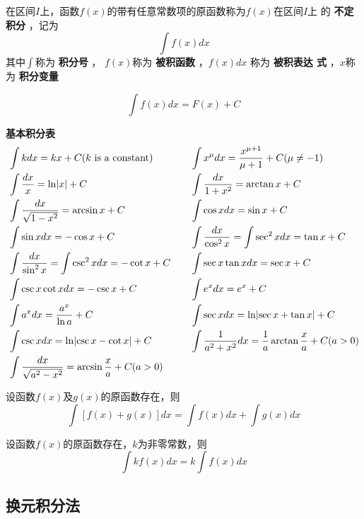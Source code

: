 \documentclass[11pt]{article}
\begin{document}
\begin{definition}[]
在区间\(I\)上，函数\(f(x)\)的带有任意常数项的原函数称为\(f(x)\)在区间\(I\)上
的 \textbf{不定积分} ，记为
\begin{equation*}
\int f(x)dx
\end{equation*}
其中\(\int\)称为 \textbf{积分号} ， \(f(x)\)称为 \textbf{被积函数} ，\(f(x)dx\) 称为 \textbf{被积表达
式} ，\(x\)称为 \textbf{积分变量}
\end{definition}

\begin{equation*}
\int f(x)dx=F(x)+C
\end{equation*}

\textbf{基本积分表}
\begin{alignat*}{2}
&\int kdx=kx+C(k\text{ is a constant})&&
\int x^\mu dx=\frac{x^{\mu+1}}{\mu+1}+C(\mu\neq-1)\\
&\int \frac{dx}{x}=\ln\abs{x}+C&&
\int\frac{dx}{1+x^2}=\arctan x+C\\
&\int\frac{dx}{\sqrt{1-x^2}}=\arcsin x+C&&
\int\cos xdx=\sin x+C\\
&\int \sin xdx=-\cos x+C&&
\int\frac{dx}{\cos^2x}=\int\sec^2xdx=\tan x+C\\
&\int\frac{dx}{\sin^2x}=\int\csc^2xdx=-\cot x+C\quad&&
\int\sec x\tan xdx=\sec x+C\\
&\int\csc x\cot xdx=-\csc x+C&&
\int e^xdx=e^x+C\\
&\int a^xdx=\frac{a^x}{\ln a}+C&&
\int\sec xdx=\ln\abs{\sec x+\tan x}+C\\
&\int\csc xdx=\ln\abs{\csc x-\cot x}+C&&
\int\frac{1}{a^2+x^2}dx=\frac{1}{a}\arctan\frac{x}{a}+C(a>0)\\
&\int\frac{dx}{\sqrt{a^2-x^2}}=\arcsin \frac{x}{a}+C(a>0)
\end{alignat*}

\begin{proposition}[]
设函数\(f(x)\)及\(g(x)\)的原函数存在，则
\begin{equation*}
\int[f(x)+g(x)]dx=\int f(x)dx+\int g(x)dx
\end{equation*}
\end{proposition}

\begin{proposition}[]
设函数\(f(x)\)的原函数存在，\(k\)为非零常数，则
\begin{equation*}
\int kf(x)dx=k\int f(x)dx
\end{equation*}
\end{proposition}
\subsection{换元积分法}
\label{sec:org77cff6f}
\end{document}

